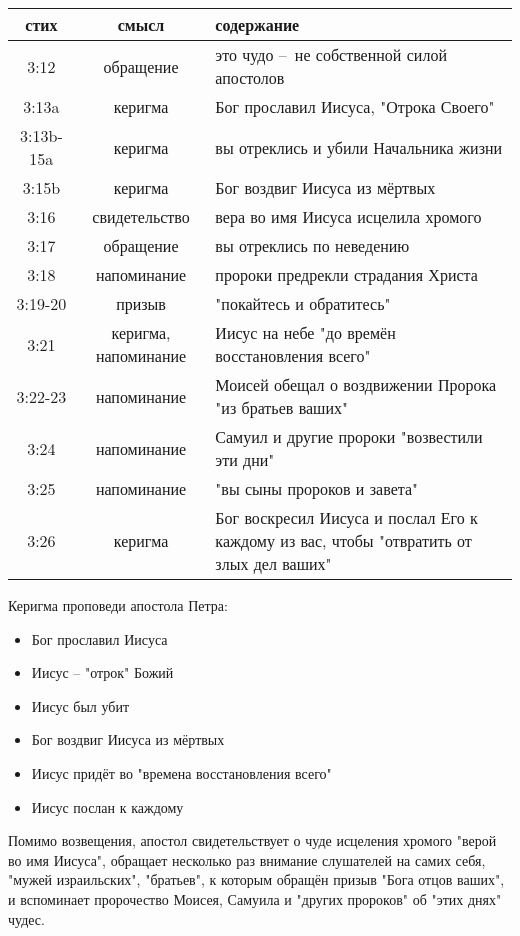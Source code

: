 \begin{center}
	\begin{longtable}{ |c|c|p{}| } 
		\hline
		 стих & смысл & содержание \\
		   \hline\hline
		   3:12 & обращение & это чудо – не собственной силой апостолов \\
		   3:13a & керигма & Бог прославил Иисуса, "Отрока Своего" \\
		     3:13b-15a & керигма & вы отреклись и убили Начальника жизни \\
		     3:15b & керигма & Бог воздвиг Иисуса из мёртвых \\
		     3:16 & свидетельство & вера во имя Иисуса исцелила хромого \\
		      3:17 & обращение & вы отреклись по неведению \\
		      3:18 & напоминание & пророки предрекли страдания Христа \\
		       3:19-20 & призыв & "покайтесь и обратитесь" \\
		       3:21 & керигма, напоминание & Иисус на небе "до времён восстановления всего" \\
		       3:22-23 & напоминание & Моисей обещал о воздвижении Пророка "из братьев ваших" \\
		       3:24 & напоминание & Самуил и другие пророки "возвестили эти дни" \\
		       3:25 & напоминание & "вы сыны пророков и завета" \\
		       3:26 & керигма & Бог воскресил Иисуса и послал Его к каждому из вас, чтобы "отвратить от злых дел ваших" \\
		\hline
	\end{longtable}
\end{center}

Керигма проповеди апостола Петра:
\begin{itemize}
	\item Бог прославил Иисуса
	\item Иисус – "отрок" Божий
	\item Иисус был убит
	\item Бог воздвиг Иисуса из мёртвых
	\item Иисус придёт во "времена восстановления всего"
	\item Иисус послан к каждому
\end{itemize}

Помимо возвещения, апостол свидетельствует о чуде исцеления хромого "верой во имя Иисуса", обращает несколько раз внимание слушателей на самих себя, "мужей израильских", "братьев", к которым обращён призыв "Бога отцов ваших", и вспоминает пророчество Моисея, Самуила и "других пророков" об "этих днях" чудес.


